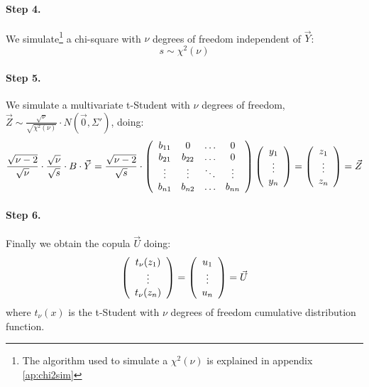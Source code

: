 \documentclass[a4paper,12pt,final]{article}
\begin{document}
\paragraph{Step 4.} We simulate\footnote{The algorithm used to simulate a $\chi^2(\nu)$
is explained in appendix \ref{ap:chi2sim}} a chi-square with $\nu$ degrees of freedom 
independent of $\vec{Y}$:
\begin{displaymath}
s \sim \chi^2(\nu)
\end{displaymath}

\paragraph{Step 5.} We simulate a multivariate t-Student with $\nu$ degrees of freedom, 
$\vec{Z} \sim \frac{\sqrt{\nu}}{\sqrt{\chi^2(\nu)}} \cdot N(\vec{0}, \Sigma')$, doing:
\begin{displaymath}
\frac{\sqrt{\nu-2}}{\sqrt{\nu}} \cdot \frac{\sqrt{\nu}}{\sqrt{s}} \cdot B \cdot \vec{Y} 
=
\frac{\sqrt{\nu-2}}{\sqrt{s}} \cdot 
\left(
\begin{array}{cccc}
b_{11}   & 0        & \ldots & 0       \cr
b_{21}   & b_{22}   & \ldots & 0       \cr
\vdots  & \vdots  & \ddots & \vdots \cr
b_{n1}   & b_{n2}   & \ldots & b_{nn}
\end{array}
\right)
\left(
\begin{array}{c}
y_1 \cr
\vdots \cr
y_n
\end{array}
\right) 
=
\left(
\begin{array}{c}
z_1 \cr
\vdots \cr
z_n
\end{array}
\right) 
= 
\vec{Z}
\end{displaymath}

\paragraph{Step 6.} Finally we obtain the copula $\vec{U}$ doing:
\begin{displaymath}
\left(
\begin{array}{c}
t_\nu(z_1) \cr
\vdots \cr
t_\nu(z_n)
\end{array}
\right) 
=
\left(
\begin{array}{c}
u_1 \cr
\vdots \cr
u_n
\end{array}
\right) 
=
\vec{U} 
\end{displaymath}
where $t_\nu(x)$ is the t-Student with $\nu$ degrees of freedom cumulative distribution 
function.

\end{document}
